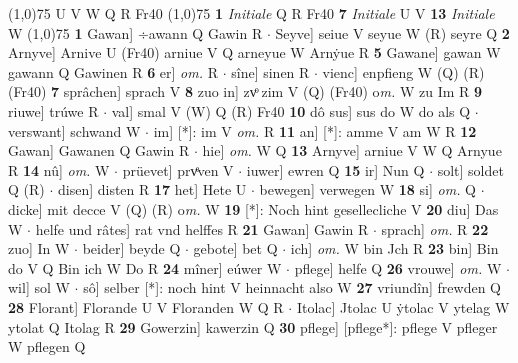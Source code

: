 \documentclass[8pt,a4paper,notitlepage]{article}
\begin{document}
\begin{table}[ht]
\begin{minipage}[t]{0.5\linewidth}
\line(1,0){75} \newline
U V W Q R Fr40 \newline
\line(1,0){75} \newline
\textbf{1} \textit{Initiale} Q R Fr40  \textbf{7} \textit{Initiale} U V  \textbf{13} \textit{Initiale} W  \newline
\line(1,0){75} \newline
\textbf{1} Gawan] ÷awann Q Gawin R  $\cdot$ Seyve] seiue V seyue W (R) seyre Q \textbf{2} Arnyve] Arnive U (Fr40) arniue V Q arneyue W Arnẏue R \textbf{5} Gawane] gawan W gawann Q Gawinen R \textbf{6} er] \textit{om.} R  $\cdot$ sîne] sinen R  $\cdot$ vienc] enpfieng W (Q) (R) (Fr40) \textbf{7} sprâchen] sprach V \textbf{8} zuo in] zvͦ zim V (Q) (Fr40) o\textit{m. } W zu Im R \textbf{9} riuwe] trúwe R  $\cdot$ val] smal V (W) Q (R) Fr40 \textbf{10} dô sus] sus do W do als Q  $\cdot$ verswant] schwand W  $\cdot$ im] [*]: im V \textit{om.} R \textbf{11} an] [*]: amme V am W R \textbf{12} Gawan] Gawanen Q Gawin R  $\cdot$ hie] \textit{om.} W Q \textbf{13} Arnyve] arniue V W Q Arnyue R \textbf{14} nû] \textit{om.} W  $\cdot$ prüevet] prvͤven V  $\cdot$ iuwer] ewren Q \textbf{15} ir] Nun Q  $\cdot$ solt] soldet Q (R)  $\cdot$ disen] disten R \textbf{17} het] Hete U  $\cdot$ bewegen] verwegen W \textbf{18} si] \textit{om.} Q  $\cdot$ dicke] mit decce V (Q) (R) o\textit{m. } W \textbf{19} [*]: Noch hint gesellecliche V \textbf{20} diu] Das W  $\cdot$ helfe und râtes] rat vnd helffes R \textbf{21} Gawan] Gawin R  $\cdot$ sprach] \textit{om.} R \textbf{22} zuo] In W  $\cdot$ beider] beyde Q  $\cdot$ gebote] bet Q  $\cdot$ ich] \textit{om.} W bin Jch R \textbf{23} bin] Bin do V Q Bin ich W Do R \textbf{24} mîner] eúwer W  $\cdot$ pflege] helfe Q \textbf{26} vrouwe] \textit{om.} W  $\cdot$ wil] sol W  $\cdot$ sô] selber [*]: noch hint V heinnacht also W \textbf{27} vriundîn] frewden Q \textbf{28} Florant] Florande U V Floranden W Q R  $\cdot$ Itolac] Jtolac U ẏtolac V ytelag W ytolat Q Itolag R \textbf{29} Gowerzin] kawerzin Q \textbf{30} pflege] [pflege*]: pflege V pfleger W pflegen Q \newline
\end{minipage}
\end{table}
\end{document}
